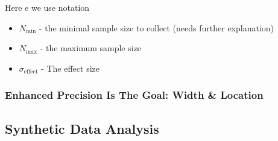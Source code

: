 Here e we use notation

  \begin{itemize}
        \item $N_\mathrm{min}$ - the minimal sample size to collect (needs further explanation)
        \item $N_\mathrm{max}$ - the maximum sample size
        \item $\sigma_\mathrm{effect}$ - The effect size
         
  \end{itemize}


\subsubsection{Enhanced Precision Is The Goal: Width \& Location}

\subsection{Synthetic Data Analysis}